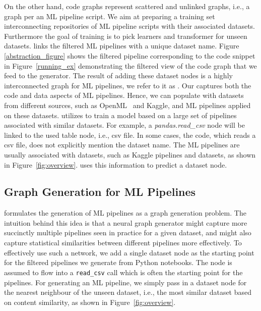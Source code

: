 On the other hand, code graphs represent scattered and unlinked graphs, i.e., a graph per an ML pipeline script. We aim at preparing a training set interconnecting repositories of ML pipeline scripts with their associated datasets. Furthermore the goal of training is to pick learners and transformer for unseen datasets. {\sysname} links the filtered ML pipelines with a unique dataset name. Figure \ref{abstraction_figure} shows the filtered pipeline corresponding to the code snippet in Figure~\ref{running_ex} demonstrating the filtered view of the code graph that we feed to the generator.
The result of adding these dataset nodes is a highly interconnected graph for ML pipelines, we refer to it as {\GML}. Our  {\GML} captures both the code and data aspects of ML pipelines. Hence, we can populate {\GML} with datasets from different sources, such as OpenML~\cite{OpenML} and Kaggle, and ML pipelines applied on these datasets. {\sysname} utilizes {\GML} to train a model based on a large set of pipelines associated with similar datasets. For example, a \textit{pandas.read\_csv} node will be linked to the used table node, i.e., csv file. In some cases, the code, which reads a csv file, does not explicitly mention the dataset name. The ML pipelines are usually associated with datasets, such as Kaggle pipelines and datasets, as shown in Figure~\ref{fig:overview}. {\sysname} uses this information to predict a dataset node.

\subsection{Graph Generation for ML Pipelines}
{\sysname} formulates the generation of ML pipelines as a graph generation problem. The intuition behind this idea is that a neural graph generator might capture more succinctly multiple pipelines seen in practice for a given dataset, and might also capture statistical similarities between different pipelines more effectively. To effectively use such a network, we add a single dataset node as the starting point for the filtered pipelines we generate from Python notebooks. The node is assumed to flow into a \texttt{read\_csv} call which is often the starting point for the pipelines. For generating an ML pipeline, we simply pass in a dataset node for the nearest neighbour of the unseen dataset, i.e., the most similar dataset based on content similarity, as shown in Figure~\ref{fig:overview}.


